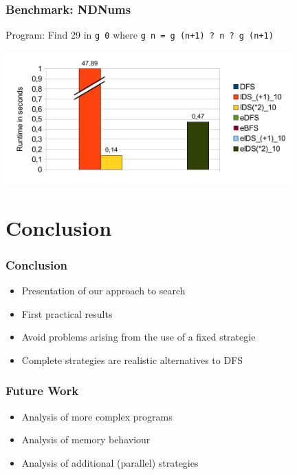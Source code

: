 \documentclass[
,hyperref={pdfpagelabels=false}
]{beamer}
\newcommand{\todo}[1]{\fbox{\sc To do: #1}}
\begin{document}
\begin{frame}[fragile]%
\frametitle{Benchmark: NDNums}
Program: Find 29 in \lstinline{g 0} where \lstinline{g n = g (n+1) ? n ? g (n+1)}
\begin{center}
\includegraphics[width=11cm]{gfx/ndnums}
\end{center}
\end{frame}

\section{Conclusion}

\begin{frame}[fragile]%
\frametitle{Conclusion}

\begin{itemize}
\item Presentation of our approach to search
\item First practical results
\item Avoid problems arising from the use of a fixed strategie
\item Complete strategies are realistic alternatives to DFS
\end{itemize}

\end{frame}

\begin{frame}[fragile]%
\frametitle{Future Work}

\begin{itemize}
\item Analysis of more complex programs
\item Analysis of memory behaviour
\item Analysis of additional (parallel) strategies
\end{itemize}

\end{frame}
\end{document}
